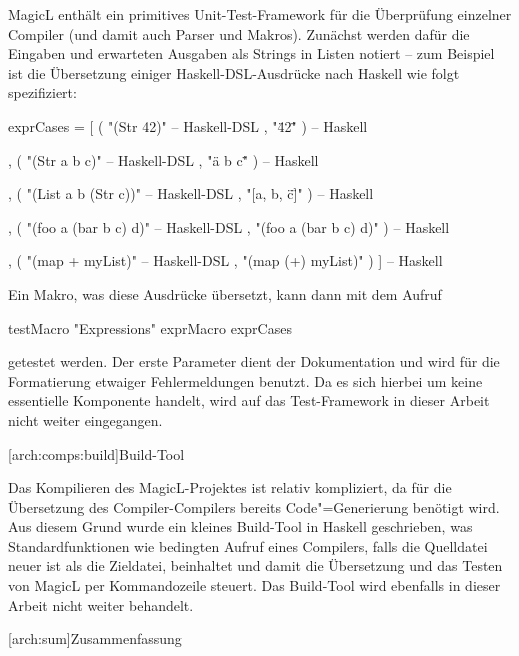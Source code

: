 \documentclass[12pt, a4paper, bibgerm]{scrbook}
\newenvironment{DIFnomarkup}{}{}
\newcommand\lsection{}
\newcommand\lsubsection{}
\newcommand{\cgen}{Code"=Generierung}
\begin{document}
MagicL enthält ein primitives Unit-Test-Framework für die Überprüfung
einzelner Compiler (und damit auch Parser und Makros). Zunächst werden
dafür die Eingaben und erwarteten Ausgaben als Strings in Listen
notiert -- zum Beispiel ist die Übersetzung einiger Haskell-DSL-Ausdrücke
nach Haskell wie folgt spezifiziert:
\begin{DIFnomarkup}\begin{code}
exprCases = [ ( "(Str 42)"                    -- Haskell-DSL 
                , "\"42\"" )                  -- Haskell 

              , ( "(Str a  b c)"              -- Haskell-DSL 
                , "\"a b c\"" )               -- Haskell 

              , ( "(List a b (Str c))"        -- Haskell-DSL 
                , "[a, b, \"c\"]" )           -- Haskell 

              , ( "(foo a (bar b c) d)"       -- Haskell-DSL 
                , "(foo a (bar b c) d)" )     -- Haskell 

              , ( "(map + myList)"            -- Haskell-DSL 
                , "(map (+) myList)" ) ]      -- Haskell 
\end{code}\end{DIFnomarkup}

Ein Makro, was diese Ausdrücke übersetzt, kann dann mit dem Aufruf
\begin{DIFnomarkup}\begin{code}
testMacro "Expressions" exprMacro exprCases  
\end{code}\end{DIFnomarkup}
getestet werden. Der erste Parameter dient der Dokumentation und wird
für die Formatierung etwaiger Fehlermeldungen benutzt. Da es sich
hierbei um keine essentielle Komponente handelt, wird auf das
Test-Framework in dieser Arbeit nicht weiter eingegangen.

\lsubsection[arch:comps:build]{Build-Tool}

Das Kompilieren des MagicL-Projektes ist relativ kompliziert, da für die
Übersetzung des Compiler-Compilers bereits \cgen{} benötigt wird. Aus
diesem Grund wurde ein kleines Build-Tool in Haskell geschrieben, was
Standardfunktionen wie bedingten Aufruf eines Compilers, falls die
Quelldatei neuer ist als die Zieldatei, beinhaltet und damit die
Übersetzung und das Testen von MagicL per Kommandozeile steuert. Das
Build-Tool wird ebenfalls in dieser Arbeit nicht weiter behandelt.

\lsection[arch:sum]{Zusammenfassung}
\end{document}
